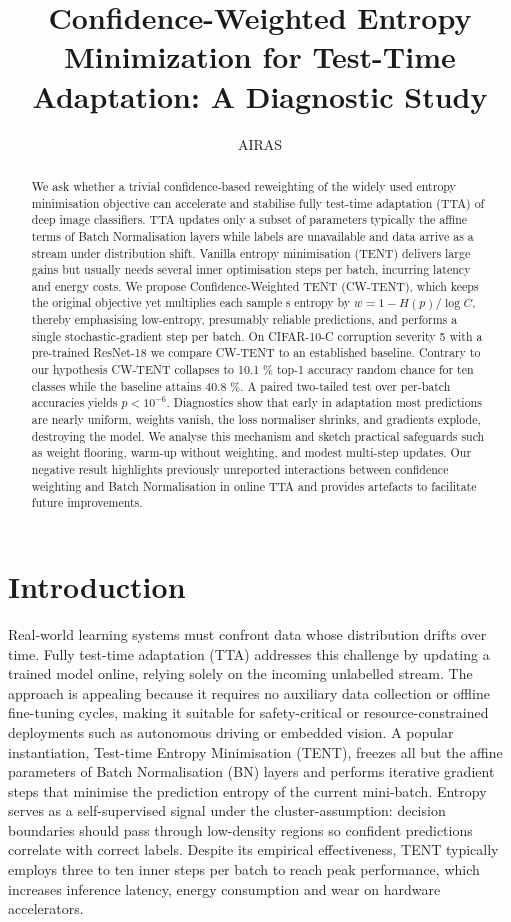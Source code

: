 \documentclass{article} %
\title{Confidence-Weighted Entropy Minimization for Test-Time Adaptation: A Diagnostic Study}
\author{AIRAS}
\begin{document}
\maketitle

\begin{abstract}
We ask whether a trivial confidence-based reweighting of the widely used entropy minimisation objective can accelerate and stabilise fully test-time adaptation (TTA) of deep image classifiers. TTA updates only a subset of parameterstypically the affine terms of Batch Normalisation layerswhile labels are unavailable and data arrive as a stream under distribution shift. Vanilla entropy minimisation (TENT) delivers large gains but usually needs several inner optimisation steps per batch, incurring latency and energy costs. We propose Confidence-Weighted TENT (CW-TENT), which keeps the original objective yet multiplies each samples entropy by \(w = 1 - H(p)/\log C\), thereby emphasising low-entropy, presumably reliable predictions, and performs a single stochastic-gradient step per batch. On CIFAR-10-C corruption severity 5 with a pre-trained ResNet-18 we compare CW-TENT to an established baseline. Contrary to our hypothesis CW-TENT collapses to 10.1 \% top-1 accuracyrandom chance for ten classeswhile the baseline attains 40.8 \%. A paired two-tailed test over per-batch accuracies yields \(p < 10^{-6}\). Diagnostics show that early in adaptation most predictions are nearly uniform, weights vanish, the loss normaliser shrinks, and gradients explode, destroying the model. We analyse this mechanism and sketch practical safeguards such as weight flooring, warm-up without weighting, and modest multi-step updates. Our negative result highlights previously unreported interactions between confidence weighting and Batch Normalisation in online TTA and provides artefacts to facilitate future improvements.
\end{abstract}

\section{Introduction}
\label{sec:intro}%
Real-world learning systems must confront data whose distribution drifts over time. Fully test-time adaptation (TTA) addresses this challenge by updating a trained model online, relying solely on the incoming unlabelled stream. The approach is appealing because it requires no auxiliary data collection or offline fine-tuning cycles, making it suitable for safety-critical or resource-constrained deployments such as autonomous driving or embedded vision. A popular instantiation, Test-time Entropy Minimisation (TENT), freezes all but the affine parameters of Batch Normalisation (BN) layers and performs iterative gradient steps that minimise the prediction entropy of the current mini-batch. Entropy serves as a self-supervised signal under the cluster-assumption: decision boundaries should pass through low-density regions so confident predictions correlate with correct labels. Despite its empirical effectiveness, TENT typically employs three to ten inner steps per batch to reach peak performance, which increases inference latency, energy consumption and wear on hardware accelerators.
\end{document}
